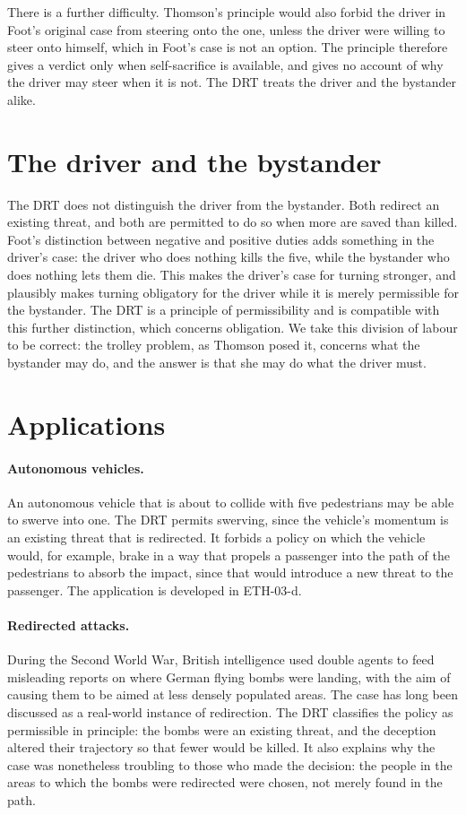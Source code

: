 \documentclass{situationist-preprint}
\begin{document}
There is a further difficulty. Thomson's principle would also forbid the driver in Foot's original case from steering onto the one, unless the driver were willing to steer onto himself, which in Foot's case is not an option. The principle therefore gives a verdict only when self-sacrifice is available, and gives no account of why the driver may steer when it is not. The DRT treats the driver and the bystander alike.

\section{The driver and the bystander}

The DRT does not distinguish the driver from the bystander. Both redirect an existing threat, and both are permitted to do so when more are saved than killed. Foot's distinction between negative and positive duties adds something in the driver's case: the driver who does nothing kills the five, while the bystander who does nothing lets them die. This makes the driver's case for turning stronger, and plausibly makes turning obligatory for the driver while it is merely permissible for the bystander. The DRT is a principle of permissibility and is compatible with this further distinction, which concerns obligation. We take this division of labour to be correct: the trolley problem, as Thomson posed it, concerns what the bystander may do, and the answer is that she may do what the driver must.

\section{Applications}

\paragraph{Autonomous vehicles.} An autonomous vehicle that is about to collide with five pedestrians may be able to swerve into one. The DRT permits swerving, since the vehicle's momentum is an existing threat that is redirected. It forbids a policy on which the vehicle would, for example, brake in a way that propels a passenger into the path of the pedestrians to absorb the impact, since that would introduce a new threat to the passenger. The application is developed in ETH-03-d.

\paragraph{Redirected attacks.} During the Second World War, British intelligence used double agents to feed misleading reports on where German flying bombs were landing, with the aim of causing them to be aimed at less densely populated areas. The case has long been discussed as a real-world instance of redirection. The DRT classifies the policy as permissible in principle: the bombs were an existing threat, and the deception altered their trajectory so that fewer would be killed. It also explains why the case was nonetheless troubling to those who made the decision: the people in the areas to which the bombs were redirected were chosen, not merely found in the path.
\end{document}
